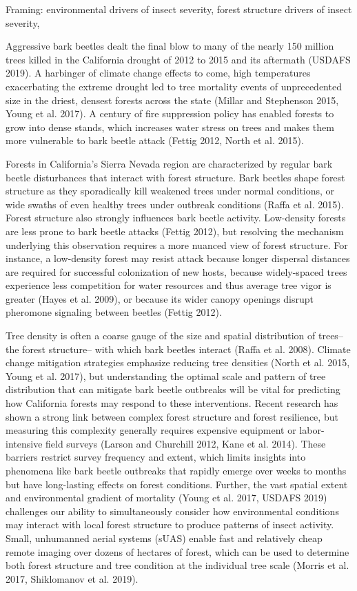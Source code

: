 \documentclass[]{article}
\begin{document}
Framing: environmental drivers of insect severity, forest structure
drivers of insect severity,

Aggressive bark beetles dealt the final blow to many of the nearly 150
million trees killed in the California drought of 2012 to 2015 and its
aftermath (USDAFS 2019). A harbinger of climate change effects to come,
high temperatures exacerbating the extreme drought led to tree mortality
events of unprecedented size in the driest, densest forests across the
state (Millar and Stephenson 2015, Young et al. 2017). A century of fire
suppression policy has enabled forests to grow into dense stands, which
increases water stress on trees and makes them more vulnerable to bark
beetle attack (Fettig 2012, North et al. 2015).

Forests in California's Sierra Nevada region are characterized by
regular bark beetle disturbances that interact with forest structure.
Bark beetles shape forest structure as they sporadically kill weakened
trees under normal conditions, or wide swaths of even healthy trees
under outbreak conditions (Raffa et al. 2015). Forest structure also
strongly influences bark beetle activity. Low-density forests are less
prone to bark beetle attacks (Fettig 2012), but resolving the mechanism
underlying this observation requires a more nuanced view of forest
structure. For instance, a low-density forest may resist attack because
longer dispersal distances are required for successful colonization of
new hosts, because widely-spaced trees experience less competition for
water resources and thus average tree vigor is greater (Hayes et al.
2009), or because its wider canopy openings disrupt pheromone signaling
between beetles (Fettig 2012).

Tree density is often a coarse gauge of the size and spatial
distribution of trees-- the forest structure-- with which bark beetles
interact (Raffa et al. 2008). Climate change mitigation strategies
emphasize reducing tree densities (North et al. 2015, Young et al.
2017), but understanding the optimal scale and pattern of tree
distribution that can mitigate bark beetle outbreaks will be vital for
predicting how California forests may respond to these interventions.
Recent research has shown a strong link between complex forest structure
and forest resilience, but measuring this complexity generally requires
expensive equipment or labor-intensive field surveys (Larson and
Churchill 2012, Kane et al. 2014). These barriers restrict survey
frequency and extent, which limits insights into phenomena like bark
beetle outbreaks that rapidly emerge over weeks to months but have
long-lasting effects on forest conditions. Further, the vast spatial
extent and environmental gradient of mortality (Young et al. 2017,
USDAFS 2019) challenges our ability to simultaneously consider how
environmental conditions may interact with local forest structure to
produce patterns of insect activity. Small, unhumanned aerial systems
(sUAS) enable fast and relatively cheap remote imaging over dozens of
hectares of forest, which can be used to determine both forest structure
and tree condition at the individual tree scale (Morris et al. 2017,
Shiklomanov et al. 2019).
\end{document}
